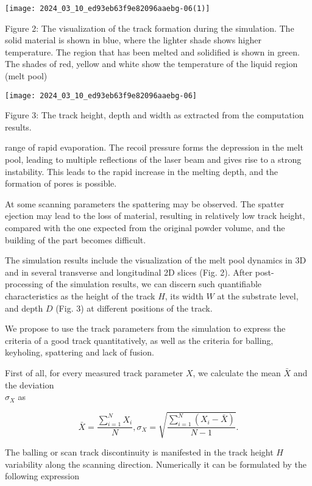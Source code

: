 \documentclass[10pt]{article}
\begin{document}
\begin{center}
\texttt{[image: 2024\_03\_10\_ed93eb63f9e82096aaebg-06(1)]}
\end{center}

Figure 2: The visualization of the track formation during the simulation. The solid material is shown in blue, where the lighter shade shows higher temperature. The region that has been melted and solidified is shown in green. The shades of red, yellow and white show the temperature of the liquid region (melt pool)

\begin{center}
\texttt{[image: 2024\_03\_10\_ed93eb63f9e82096aaebg-06]}
\end{center}

Figure 3: The track height, depth and width as extracted from the computation results.

range of rapid evaporation. The recoil pressure forms the depression in the melt pool, leading to multiple reflections of the laser beam and gives rise to a strong instability. This leads to the rapid increase in the melting depth, and the formation of pores is possible.

At some scanning parameters the spattering may be observed. The spatter ejection may lead to the loss of material, resulting in relatively low track height, compared with the one expected from the original powder volume, and the building of the part becomes difficult.

The simulation results include the visualization of the melt pool dynamics in 3D and in several transverse and longitudinal 2D slices (Fig. 2). After post-processing of the simulation results, we can discern such quantifiable characteristics as the height of the track $H$, its width $W$ at the substrate level, and depth $D$ (Fig. 3) at different positions of the track.

We propose to use the track parameters from the simulation to express the criteria of a good track quantitatively, as well as the criteria for balling, keyholing, spattering and lack of fusion.

First of all, for every measured track parameter $X$, we calculate the mean $\bar{X}$ and the deviation\\
$\sigma_{X}$ as

$$
\bar{X}=\frac{\sum_{i=1}^{N} X_{i}}{N}, \sigma_{X}=\sqrt{\frac{\sum_{i=1}^{N}\left(X_{i}-\bar{X}\right)}{N-1}} .
$$

The balling or scan track discontinuity is manifested in the track height $H$ variability along the scanning direction. Numerically it can be formulated by the following expression
\end{document}
